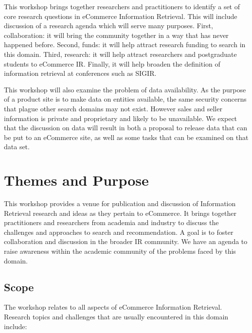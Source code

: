 \documentclass[sigconf]{acmart}
\begin{document}
This workshop brings together researchers and practitioners to
identify a set of core research questions in eCommerce Information Retrieval.
This will include discussion of a research agenda which will serve many purposes. First, collaboration: it will bring the
community together in a way that has never happened before.  Second,
funds: it will help attract research funding to search in this domain.
Third, research: it will help attract researchers and postgraduate
students to eCommerce IR.  Finally, it will help broaden the
definition of information retrieval at conferences such as SIGIR. 

This workshop will also examine the problem of data availability.  As the
purpose of a product site is to make data on entities available, the
same security concerns that plague other search domains may not exist.
However sales and seller information is private and proprietary and
likely to be unavailable.  We expect that the discussion on data will result
in both a proposal to release data that can be put to an eCommerce site, as well
as some tasks that can be examined on that data set.



\section{Themes and Purpose}
This workshop provides a venue for publication and discussion of
Information Retrieval research and ideas as they pertain to eCommerce.
It brings together practitioners and researchers from academia and
industry to discuss the challenges and approaches to search and
recommendation.  A goal is to foster collaboration and discussion in the
broader IR community.  We have an agenda to raise awareness within the
academic community of the problems faced by this domain.

\subsection{Scope}
The workshop relates to all aspects of eCommerce Information Retrieval.
Research topics and challenges that are usually encountered in this domain include:
\end{document}
